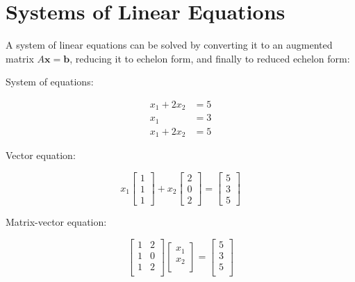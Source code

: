 \section{Systems of Linear Equations}

A system of linear equations can be solved by converting it to an augmented matrix $A \mathbf{x} = \mathbf{b}$, reducing it to echelon form, and finally to reduced echelon form:

\begin{paracol}{3}

System of equations:

\vspace{-20pt}

\begin{align*} 
    x_1 + 2 x_2 &= 5 \\ 
    x_1         &= 3 \\  
    x_1 + 2 x_2 &= 5  
\end{align*}

\switchcolumn

Vector equation:

$$x_1 \begin{bmatrix}1 \\ 1 \\ 1\end{bmatrix} + x_2 \begin{bmatrix}2 \\ 0 \\ 2\end{bmatrix} = \begin{bmatrix}5 \\ 3 \\ 5\end{bmatrix}$$

\switchcolumn

Matrix-vector equation:

$$
\begin{bmatrix}
    1 & 2 \\
    1 & 0 \\
    1 & 2 \\
\end{bmatrix}
\begin{bmatrix}
    x_1 \\
    x_2 \\
\end{bmatrix}
=
\begin{bmatrix}
    5 \\
    3 \\
    5 \\
\end{bmatrix}
$$


\end{paracol}
